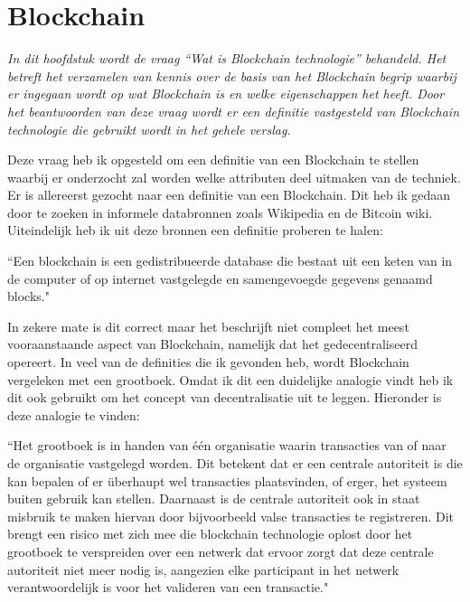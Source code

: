 \section{Blockchain}
\label{chapter:blockchain}

\textit{
  In dit hoofdstuk wordt de vraag  ``Wat is Blockchain technologie'' behandeld. Het betreft het verzamelen van kennis over de basis van het Blockchain begrip waarbij er ingegaan wordt op wat Blockchain is en welke eigenschappen het heeft. Door het beantwoorden van deze vraag wordt er een definitie vastgesteld van Blockchain technologie die gebruikt wordt in het gehele verslag.
}

Deze vraag heb ik opgesteld om een definitie van een Blockchain te stellen waarbij er onderzocht zal worden welke attributen deel uitmaken van de techniek. Er is allereerst gezocht naar een definitie van een Blockchain. Dit heb ik gedaan door te zoeken in informele databronnen zoals Wikipedia en de Bitcoin wiki. Uiteindelijk heb ik uit deze bronnen een definitie proberen te halen:
\\

\begin{formal}
  \label{definition:blockchain}
  ``Een blockchain is een gedistribueerde database die bestaat uit een keten van in de computer of op internet vastgelegde en samengevoegde gegevens genaamd blocks."
\end{formal}

In zekere mate is dit correct maar het beschrijft niet compleet het meest vooraanstaande aspect van Blockchain, namelijk dat het gedecentraliseerd opereert. In veel van de definities die ik gevonden heb, wordt Blockchain vergeleken met een grootboek. Omdat ik dit een duidelijke analogie vindt heb ik dit ook gebruikt om het concept van decentralisatie uit te leggen. Hieronder is deze analogie te vinden: 
\\

\begin{formal}
  \label{definition:decentralisation}
  ``Het grootboek is in handen van één organisatie waarin transacties van of naar de organisatie vastgelegd worden. Dit betekent dat er een centrale autoriteit is die kan bepalen of er überhaupt wel transacties plaatsvinden, of erger, het systeem buiten gebruik kan stellen. Daarnaast is de centrale autoriteit ook in staat misbruik te maken hiervan door bijvoorbeeld valse transacties te registreren. Dit brengt een risico met zich mee die blockchain technologie oplost door het grootboek te verspreiden over een netwerk dat ervoor zorgt dat deze centrale autoriteit niet meer nodig is, aangezien elke participant in het netwerk verantwoordelijk is voor het valideren van een transactie."
\end{formal}

